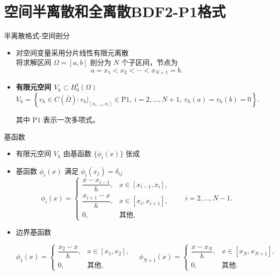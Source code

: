 \documentclass[aspectratio=169, xetex, 12pt]{beamer}  %
\begin{document}
	\section{空间半离散和全离散BDF2-P1格式}
	
	\begin{frame}{半离散格式-空间剖分}
		\begin{itemize}
			\item 对空间变量采用分片线性有限元离散\\
		\vspace{1em}
			将求解区间 $\Omega = [a,b]$ 剖分为 $N$ 个子区间，节点为
			\[
			a = x_1 < x_2 < \cdots < x_{N+1} = b.
			\]
	\vspace{1em}
	\item \textbf{有限元空间 $V_h \subset H_0^1(\Omega)$}
			\[
			V_h = \left\{v_h \in C(\overline{\Omega}) : \left. v_h \right|_{[x_{i-1},x_i]} \in \mathrm{P}1, \ i = 2, \ldots, N+1,\ v_h(a) = v_h(b) = 0 \right\}.
			\]
		
		其中 $\mathrm{P}1$ 表示一次多项式。
	\end{itemize}
	\end{frame}
	
\begin{frame}{基函数}
   \begin{itemize}
   	\setlength{\itemsep}{0.7em}  
   	\item 有限元空间 $V_h$ 由基函数 $\{\phi_i(x)\}$ 张成
   	\item 基函数 $\phi_i(x)$ 满足 $\phi_i(x_j) = \delta_{ij}$
\[	\phi_i(x) =
\begin{cases}
	\dfrac{x - x_{i-1}}{h}, & x \in [x_{i-1}, x_i], \\[6pt]
	\dfrac{x_{i+1} - x}{h}, & x \in [x_i, x_{i+1}], \\
	0, & \text{其他},
\end{cases}
\qquad i = 2, \dots, N-1.\]
		\item 边界基函数
		
		\[
		\phi_1(x) =
		\begin{cases}
			\dfrac{x_2-x}{h}, & x \in [x_1, x_2], \\
			0, & \text{其他},
		\end{cases}
		\quad
		\phi_{N+1}(x) =
		\begin{cases}
			\dfrac{x-x_N}{h}, & x \in [x_N, x_{N+1}], \\
			0, & \text{其他}.
		\end{cases}
		\]

\end{itemize}
\end{frame}
\end{document}
